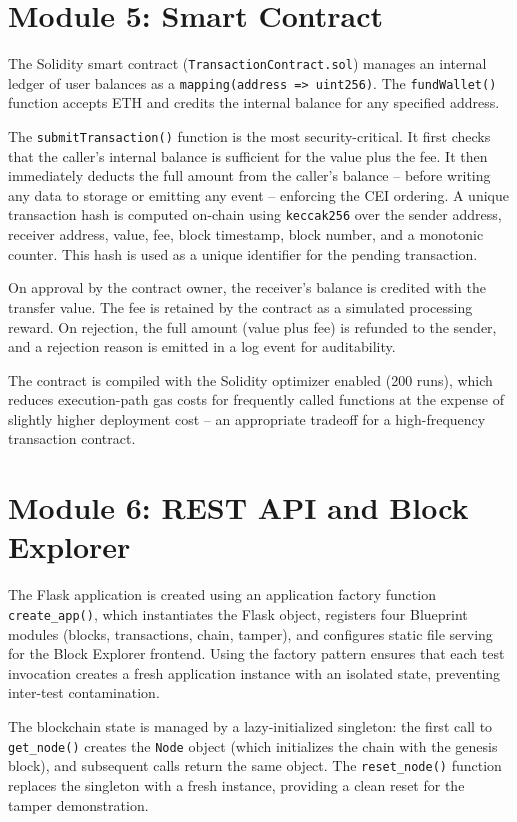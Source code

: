 \documentclass[12pt,a4paper]{report}
\begin{document}
\section{Module 5: Smart Contract}

The Solidity smart contract (\texttt{TransactionContract.sol}) manages an internal ledger
of user balances as a \texttt{mapping(address => uint256)}. The \texttt{fundWallet()}
function accepts ETH and credits the internal balance for any specified address.

The \texttt{submitTransaction()} function is the most security-critical. It first checks
that the caller's internal balance is sufficient for the value plus the fee. It then
immediately deducts the full amount from the caller's balance -- before writing any data
to storage or emitting any event -- enforcing the CEI ordering. A unique transaction hash
is computed on-chain using \texttt{keccak256} over the sender address, receiver address,
value, fee, block timestamp, block number, and a monotonic counter. This hash is used as
a unique identifier for the pending transaction.

On approval by the contract owner, the receiver's balance is credited with the transfer
value. The fee is retained by the contract as a simulated processing reward. On rejection,
the full amount (value plus fee) is refunded to the sender, and a rejection reason is
emitted in a log event for auditability.

The contract is compiled with the Solidity optimizer enabled (200 runs), which reduces
execution-path gas costs for frequently called functions at the expense of slightly higher
deployment cost -- an appropriate tradeoff for a high-frequency transaction contract.

\section{Module 6: REST API and Block Explorer}

The Flask application is created using an application factory function \texttt{create\_app()},
which instantiates the Flask object, registers four Blueprint modules (blocks, transactions,
chain, tamper), and configures static file serving for the Block Explorer frontend. Using
the factory pattern ensures that each test invocation creates a fresh application instance
with an isolated state, preventing inter-test contamination.

The blockchain state is managed by a lazy-initialized singleton: the first call to
\texttt{get\_node()} creates the \texttt{Node} object (which initializes the chain with
the genesis block), and subsequent calls return the same object. The \texttt{reset\_node()}
function replaces the singleton with a fresh instance, providing a clean reset for the
tamper demonstration.
\end{document}
